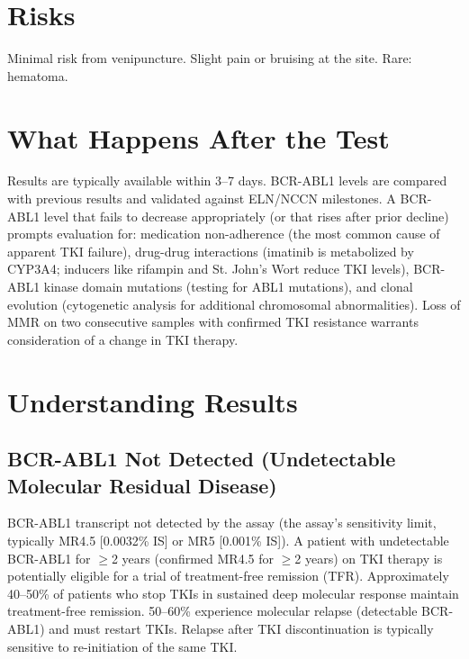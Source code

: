\section*{Risks}
Minimal risk from venipuncture. Slight pain or bruising at the site. Rare: hematoma.

\section*{What Happens After the Test}
Results are typically available within 3--7 days. BCR-ABL1 levels are compared with previous results and validated against ELN/NCCN milestones. A BCR-ABL1 level that fails to decrease appropriately (or that rises after prior decline) prompts evaluation for: medication non-adherence (the most common cause of apparent TKI failure), drug-drug interactions (imatinib is metabolized by CYP3A4; inducers like rifampin and St. John's Wort reduce TKI levels), BCR-ABL1 kinase domain mutations (testing for ABL1 mutations), and clonal evolution (cytogenetic analysis for additional chromosomal abnormalities). Loss of MMR on two consecutive samples with confirmed TKI resistance warrants consideration of a change in TKI therapy.

\section*{Understanding Results}

\subsection*{BCR-ABL1 Not Detected (Undetectable Molecular Residual Disease)}
BCR-ABL1 transcript not detected by the assay (the assay's sensitivity limit, typically MR4.5 [0.0032\% IS] or MR5 [0.001\% IS]). A patient with undetectable BCR-ABL1 for $\geq$2 years (confirmed MR4.5 for $\geq$2 years) on TKI therapy is potentially eligible for a trial of treatment-free remission (TFR). Approximately 40--50\% of patients who stop TKIs in sustained deep molecular response maintain treatment-free remission. 50--60\% experience molecular relapse (detectable BCR-ABL1) and must restart TKIs. Relapse after TKI discontinuation is typically sensitive to re-initiation of the same TKI.


